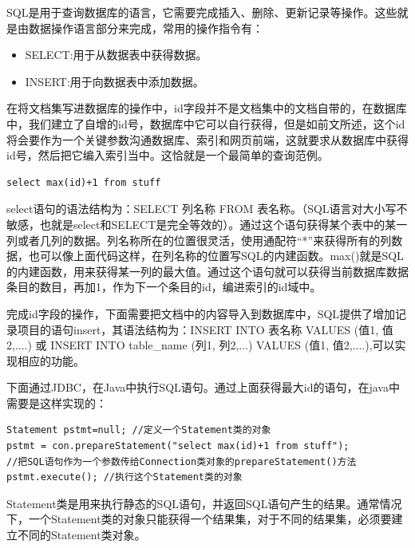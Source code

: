 \documentclass[12pt,a4paper]{article}
\begin{document}
	{\Times SQL}是用于查询数据库的语言，它需要完成插入、删除、更新记录等操作。这些就是由数据操作语言部分来完成，常用的操作指令有：
	
	\begin{itemize}
		\item
	{\Times SELECT}:用于从数据表中获得数据。
		\item
	{\Times INSERT}:用于向数据表中添加数据。
	\end{itemize}
	
	在将文档集写进数据库的操作中，{\Times id}字段并不是文档集中的文档自带的，在数据库中，我们建立了自增的{\Times id}号，数据库中它可以自行获得，但是如前文所述，这个{\Times id}将会要作为一个关键参数沟通数据库、索引和网页前端，这就要求从数据库中获得{\Times id}号，然后把它编入索引当中。这恰就是一个最简单的查询范例。
	
	\lstset{language=SQL,frame=lines}
	\begin{lstlisting}
select max(id)+1 from stuff
	\end{lstlisting}	
	
	{\Times select}语句的语法结构为：{\Times SELECT }列名称 {\Times FROM }表名称。（{\Times SQL}语言对大小写不敏感，也就是{\Times select}和{\Times SELECT}是完全等效的）。通过这个语句获得某个表中的某一列或者几列的数据。列名称所在的位置很灵活，使用通配符“*”来获得所有的列数据，也可以像上面代码这样，在列名称的位置写{\Times SQL}的内建函数。{\Times max()}就是{\Times SQL}的内建函数，用来获得某一列的最大值。通过这个语句就可以获得当前数据库数据条目的数目，再加1，作为下一个条目的{\Times id}，编进索引的{\Times id}域中。
	
	完成{\Times id}字段的操作，下面需要把文档中的内容导入到数据库中，{\Times SQL}提供了增加记录项目的语句{\Times insert}，其语法结构为：{\Times INSERT INTO }表名称 {\Times VALUES }(值1, 值2,....)	或 {\Times INSERT INTO table\_{}name} (列1, 列2,...) {\Times VALUES }(值1, 值2,....),可以实现相应的功能。
	
	下面通过{\Times JDBC}，在{\Times Java}中执行{\Times SQL}语句。通过上面获得最大{\Times id}的语句，在{\Times java}中需要是这样实现的：
	\lstset{language=Java,frame=lines}
	\begin{lstlisting}
Statement pstmt=null; //定义一个Statement类的对象
pstmt = con.prepareStatement("select max(id)+1 from stuff");
//把SQL语句作为一个参数传给Connection类对象的prepareStatement()方法
pstmt.execute(); //执行这个Statement类的对象
	\end{lstlisting}	
	
	{\Times Statement}类是用来执行静态的{\Times SQL}语句，并返回{\Times SQL}语句产生的结果。通常情况下，一个{\Times Statement}类的对象只能获得一个结果集，对于不同的结果集，必须要建立不同的{\Times Statement}类对象。
	
\end{document}
